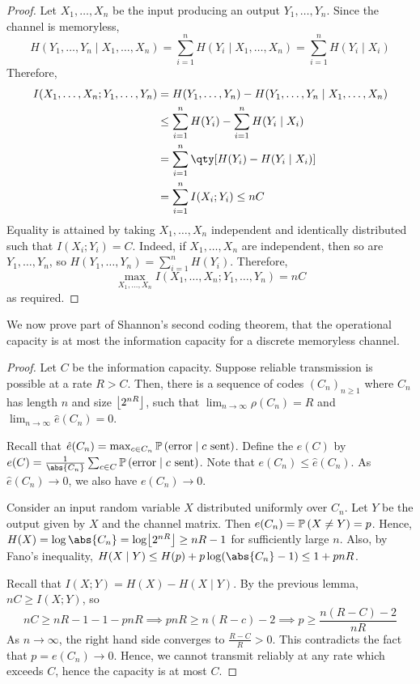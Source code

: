\begin{proof}
    Let $X_1, \dots, X_n$ be the input producing an output $Y_1, \dots, Y_n$.
    Since the channel is memoryless,
    \[ H(Y_1, \dots, Y_n \mid X_1, \dots, X_n) = \sum_{i=1}^n H(Y_i \mid X_1, \dots, X_n) = \sum_{i=1}^n H(Y_i \mid X_i) \]
    Therefore,
    \begin{align*}
        I(X_1, \dots, X_n; Y_1, \dots, Y_n) &= H(Y_1, \dots, Y_n) - H(Y_1, \dots, Y_n \mid X_1, \dots, X_n) \\
        &\leq \sum_{i=1}^n H(Y_i) - \sum_{i=1}^n H(Y_i \mid X_i) \\
        &= \sum_{i=1}^n \qty[H(Y_i) - H(Y_i \mid X_i)] \\
        &= \sum_{i=1}^n I(X_i;Y_i) \leq nC
    \end{align*}
    Equality is attained by taking $X_1, \dots, X_n$ independent and identically distributed such that $I(X_i;Y_i) = C$.
    Indeed, if $X_1, \dots, X_n$ are independent, then so are $Y_1, \dots, Y_n$, so $H(Y_1, \dots, Y_n) = \sum_{i=1}^n H(Y_i)$.
    Therefore,
    \[ \max_{X_1, \dots, X_n} I(X_1, \dots, X_n; Y_1, \dots, Y_n) = nC \]
    as required.
\end{proof}
We now prove part of Shannon's second coding theorem, that the operational capacity is at most the information capacity for a discrete memoryless channel.
\begin{proof}
    Let $C$ be the information capacity.
    Suppose reliable transmission is possible at a rate $R > C$.
    Then, there is a sequence of codes $(C_n)_{n \geq 1}$ where $C_n$ has length $n$ and size $\floor*{2^{nR}}$, such that $\lim_{n \to \infty} \rho(C_n) = R$ and $\lim_{n \to \infty} \hat e(C_n) = 0$.

    Recall that $\hat e(C_n) = \max_{c \in C_n} \prob{\text{error} \mid c \text{ sent}}$.
    Define the  $e(C)$ by $e(C) = \frac{1}{\abs{C_n}} \sum_{c \in C} \prob{\text{error} \mid c \text{ sent}}$.
    Note that $e(C_n) \leq \hat e(C_n)$.
    As $\hat e(C_n) \to 0$, we also have $e(C_n) \to 0$.

    Consider an input random variable $X$ distributed uniformly over $C_n$.
    Let $Y$ be the output given by $X$ and the channel matrix.
    Then $e(C_n) = \prob{X \neq Y} = p$.
    Hence, $H(X) = \log \abs{C_n} = \log \floor*{2^{nR}} \geq nR - 1$ for sufficiently large $n$.
    Also, by Fano's inequality, $H(X \mid Y) \leq H(p) + p \log(\abs{C_n} - 1) \leq 1 + pnR$.

    Recall that $I(X;Y) = H(X) - H(X \mid Y)$.
    By the previous lemma, $nC \geq I(X;Y)$, so
    \[ nC \geq nR - 1 - 1 - pnR \implies pnR \geq n(R - c) - 2 \implies p \geq \frac{n(R - C) - 2}{nR} \]
    As $n \to \infty$, the right hand side converges to $\frac{R - C}{R} > 0$.
    This contradicts the fact that $p = e(C_n) \to 0$.
    Hence, we cannot transmit reliably at any rate which exceeds $C$, hence the capacity is at most $C$.
\end{proof}
